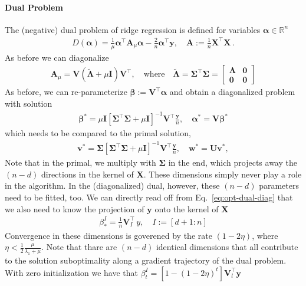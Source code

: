 \documentclass{article}
\newcommand{\w}{{\mathbf w}}
\renewcommand{\v}{{\mathbf v}}
\newcommand{\y}{{\mathbf y}}
\newcommand{\I}{{\mathbf I}}
\newcommand{\mX}{{\mathbf X}}
\newcommand{\mU}{{\mathbf U}}
\newcommand{\mA}{{\mathbf A}}
\newcommand{\mV}{{\mathbf V}}
\renewcommand{\Re}{{\mathbb R}}
\newcommand{\mSigma}{{\mathbf \Sigma}}
\newcommand{\mLambda}{{\mathbf \Lambda}}
\newcommand{\vAlpha}{{\bm \alpha}}
\newcommand{\vBeta}{{\bm \beta}}
\begin{document}
\paragraph{Dual Problem} The (negative) dual problem of  ridge regression is defined for variables $\vAlpha \in \Re^n$ 
\begin{align}
D(\vAlpha) = \frac{1}{\mu} \vAlpha^\top \mA_\mu \vAlpha - \frac 2n \vAlpha^\top \y, \quad 
\mA := \frac 1n \mX^\top \mX \,.
\end{align}
As before we can diagonalize 
\begin{align}
\mA_\mu = \mV \left( \tilde \mLambda + \mu \I \right) \mV^\top, \quad\text{where} \quad \tilde \mLambda = \mSigma^\top \mSigma = \begin{bmatrix}
\mLambda & \bm 0 \\ \bm 0 & \bm 0
\end{bmatrix}
\end{align}
As before, we can re-parameterize $\vBeta := \mV^\top \vAlpha$ and obtain a diagonalized problem with solution
\begin{align}
\vBeta^*  = \mu \I \left[ \mSigma^\top \mSigma + \mu \I \right]^{-1}  \mV^\top \frac \y n, \quad \vAlpha^* = \mV \vBeta^*
\label{eq:opt-dual-diag}
\end{align}
which needs to be compared to the primal solution, 
\begin{align}
\v^* = \mSigma  \left[ \mSigma^\top \mSigma + \mu \I \right]^{-1} \mV^\top \frac \y n, \quad \w^* = \mU \v^*,
\end{align}
Note that in the primal, we multiply with $\mSigma$ in the end, which projects away the $(n-d)$ directions in the kernel of $\mX$. These dimensions simply never play a role in the algorithm. In the (diagonalized) dual, however, these $(n-d)$ parameters need to be fitted, too. We can directly read off from Eq.~\eqref{eq:opt-dual-diag} that we also need to know the projection of $\y$ onto the kernel of $\mX$
\begin{align}
\beta^{I}_* = \frac 1n \mV_{I}^\top \, y , \quad I := [d+1:n]
\end{align}
Convergence in these dimensions is goverened by the rate $(1-2\eta)$, where $\eta < \frac 12 \frac{\mu}{\lambda_1+\mu}$. Note that thare are $(n-d)$ identical dimensions that all contribute to the solution suboptimality along a gradient trajectory of the dual problem. With zero initialization we have that $\beta^I_t = \left[ 1-(1-2\eta)^t \right] \mV_l^\top \y $
\end{document}
